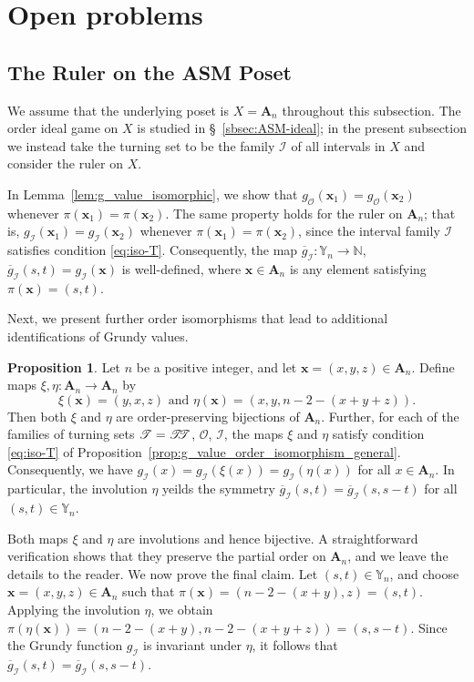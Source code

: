 \documentclass[a4paper,11pt]{amsart}
\theoremstyle{definition}
\newtheorem{prop}{Proposition}[section]
\newenvironment{demo}[1]{%
  \trivlist
  \item[\hskip\labelsep
        {\bf #1.}]
}{%
\hfill\qedsymbol
  \endtrivlist
}
\numberwithin{equation}{section}
\def\Non{\mathbb{N}}
\def\T{\mathscr{T}}
\def\TT{\mathscr{T}\kern-4pt\mathscr{T}}
\def\OI{\mathscr{O}}
\def\I{\mathscr{I}}
\def\ASM#1{\boldsymbol{A}_{#1}}
\def\Y#1{\mathbb{Y}_{#1}}
\def\x{\boldsymbol{x}}
\begin{document}
%
%
%
%
%
\section{Open problems}\label{sc:open}
%
%
%
%
\subsection{The Ruler on the ASM Poset}
%
%
We assume that the underlying poset is $X=\ASM{n}$ throughout this subsection.
The order ideal game on $X$ is studied in \S~\ref{sbsec:ASM-ideal}; 
in the present subsection we instead take the turning set to be the family $\I$ of all intervals in $X$
and consider the ruler on $X$.
%
\par
%
In Lemma~\ref{lem:g_value_isomorphic},
we show that $g_{\OI}(\x_{1})=g_{\OI}(\x_{2})$ whenever $\pi(\x_{1})=\pi(\x_{2})$.
The same property holds for the ruler on $\ASM{n}$; that is,
$g_{\I}(\x_{1})=g_{\I}(\x_{2})$ whenever $\pi(\x_{1})=\pi(\x_{2})$,
since the interval family $\I$ satisfies condition \eqref{eq:iso-T}.
Consequently, the map ${\overline g}_{\I}\colon \Y{n} \to \Non$, ${\overline g}_{\I}(s,t)=g_{\I}(\x)$ is well-defined,
where $\x \in \ASM{n}$ is any element satisfying $\pi(\x)=(s,t)$.
%
\par
%
Next, we present further order isomorphisms that lead to additional identifications of Grundy values.
%
\begin{prop}\label{lem:isomorphism_eta}
	Let $n$ be a positive integer,
	and let $\x = \left( x, y, z \right) \in \ASM{n}$.
	Define maps $\xi,\eta \colon \ASM{n} \to \ASM{n}$ by
	\[
	\xi\left( \x \right)=\left( y, x, z \right)
	\text{ and }
	\eta\left( \x \right)=\left( x, y, n - 2 - (x + y + z) \right).
	\]
	Then both $\xi$ and $\eta$ are order-preserving bijections of $\ASM{n}$.
	Further, for each of the families of turning sets $\T=\TT$, $\OI$, $\I$,
	the maps $\xi$ and $\eta$ satisfy condition \eqref{eq:iso-T} of Proposition~\ref{prop:g_value_order_isomorphism_general}.
	Consequently,
	we have $g_{\I}(x)=g_{\I}(\xi(x))=g_{\I}(\eta(x))$ for all $x\in\ASM{n}$.
	In particular, the involution $\eta$ yeilds the symmetry ${\overline g}_{\I}(s,t)={\overline g}_{\I}(s,s-t)$ for all $(s,t)\in \Y{n}$.
\end{prop}
%
\begin{demo}{Proof}
%
Both maps $\xi$ and $\eta$ are involutions and hence bijective.
A straightforward verification shows that they preserve the partial order on $\ASM{n}$, 
and we leave the details to the reader.
%
We now prove the final claim.
Let $(s,t)\in \Y{n}$, and choose $\x=(x,y,z)\in \ASM{n}$ such that $\pi(\x)=(n-2-(x+y),z)=(s,t)$.
Applying the involution $\eta$, we obtain $\pi\left(\eta(\x)\right)=\left(n-2-(x+y),n-2-(x+y+z)\right)=(s,s-t)$.
Since the Grundy function $g_{\I}$ is invariant under $\eta$, it follows that ${\overline g}_{\I}(s,t)={\overline g}_{\I}(s,s-t)$.
%
\end{demo}
\end{document}
